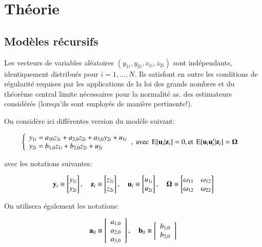 \documentclass[10pt, reqno]{amsart}
\begin{document}
\section{Théorie}

\subsection{Modèles récursifs}
Les vecteurs de variables aléatoires $(y_{1i},y_{2i},z_{1i},z_{2i})$ sont indépendants, identiquement distribués pour 
$i= 1,\ldots, N$. Ils satisfont en outre les conditions de régularité requises par les applications de la loi
 des grands nombres et du théorème central limite nécessaires pour la normalité as. des estimateurs considérés 
 (lorsqu’ils sont employés de manière pertinente!). 

 On considère ici différentes version du modèle suivant:

    
 \begin{align}
    \left\{
 \begin{array}{l}
    y_{1i} = a_{10}z_{1i} + a_{2,0}z_{2i} + a_{3,0}y_{2i} +u_{1i}\\
    y_{2i}= b_{1,0}z_{1i} + b_{2,0}z_{2i}+u_{2i}
 \end{array}
\right.
&, \ \text{avec} \  \Exp[\boldu_i|\boldz_i] =0,  \text{et} \ \Exp[\boldu_i\boldu_i^\prime|\boldz_i]=\boldOmega
\label{eq1}
 \end{align}

 avec les notations suivantes:

 \[
    {\mathbf y}_i \equiv 
    \begin{bmatrix}
        y_{1i}\\
        y_{2i}
    \end{bmatrix}
    , \quad 
    {\mathbf z}_i \equiv 
\begin{bmatrix}
    z_{1i}\\
    z_{2i}
\end{bmatrix}
, \quad 
{\mathbf u}_i \equiv 
\begin{bmatrix}
    u_{1i}\\
    u_{2i}
\end{bmatrix}
, \quad 
{\boldsymbol \Omega} \equiv
\begin{bmatrix}
    \omega_{11}&\omega_{12}\\
    \omega_{12}&\omega_{22}
\end{bmatrix}
 \]
    
 On utilisera également les notations:


 \begin{align*}
    {\mathbf a}_0 \equiv 
    \left[
    \begin{array}{l}
        a_{1,0}\\
        a_{2, 0}\\
        a_{3, 0}
    \end{array}
    \right]
    , \quad 
    {\mathbf b}_0 \equiv 
 \left[
 \begin{array}{l}
    b_{1,0}\\
    b_{2,0}
\end{array}
 \right]
\end{align*}
\end{document}
